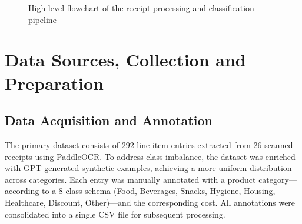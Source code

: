 \documentclass{SGGW-thesis-EN}
\begin{document}
\begin{figure}[h!]
  \centering
  \caption{High‐level flowchart of the receipt processing and classification pipeline}
  \label{fig:pipeline_flowchart_vertical}
\end{figure}


\section{Data Sources, Collection and Preparation}

\subsection{Data Acquisition and Annotation}
The primary dataset consists of 292 line‐item entries extracted from 26 scanned receipts using PaddleOCR. To address class imbalance,
the dataset was enriched with GPT‐generated synthetic examples, achieving a more uniform distribution across categories. Each entry was manually annotated
with a product category— according to a  8‐class schema (Food, Beverages, Snacks, Hygiene,
Housing, Healthcare, Discount, Other)—and the corresponding cost. All annotations were consolidated into a single CSV file for subsequent processing.
\end{document}
